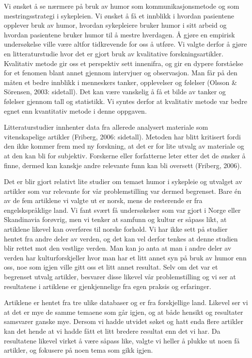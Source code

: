 Vi ønsket å se nærmere på bruk av humor som kommunikasjonsmetode og som
mestringsstrategi i sykepleien. Vi ønsket å få et innblikk i hvordan pasientene
opplever bruk av humor, hvordan sykepleiere bruker humor i sitt arbeid og
hvordan pasientene bruker humor til å mestre hverdagen. Å gjøre en empirisk
undersøkelse ville være altfor tidkrevende for oss å utføre. Vi valgte derfor å
gjøre en litteraturstudie hvor det er gjort bruk av kvalitative
forskningsartikler. Kvalitativ metode gir oss et perspektiv sett innenifra, og
gir en dypere forståelse for et fenomen blant annet gjennom intervjuer og
observasjon. Man får på den måten et bedre innblikk i menneskers tanker,
opplevelser og følelser (Olsson \&{} Sörensen, 2003: sidetall). Det kan være
vanskelig å få et bilde av tanker og følelser gjennom tall og statistikk. Vi
syntes derfor at kvalitativ metode var bedre egnet enn kvantitativ metode i
denne oppgaven.

Litteraturstudier innhenter data fra allerede analysert materiale som
vitenskapelige artikler (Friberg, 2006: sidetall). Metoden har blitt kritisert
fordi den ikke kommer frem med ny forskning, at det er for lite utvalg av
materiale og at den kan bli for subjektiv. Forskerne eller forfatterne leter
etter det de ønsker å finne, dermed kan kanskje andre relevante funn kan bli
oversett (Friberg, 2006).

Det er blir gjort relativt lite studier om temaet humor i sykepleie og utvalget
av artikler som var relevante for vår problemstilling var dermed begrenset.
Bare én av de fem artiklene vi valgte ut er norsk, mens de resterende er fra
engelskspråklige land. Vi fant svært få undersøkelser som var gjort i Norge
eller Skandinavia forøvrig, men vi tenker at samfunn og kultur er såpass likt,
at artiklene likevel kan overføres til norske forhold. Vi har ikke sett på
studier hentet fra andre deler av verden, og det kan vel derfor tenkes at denne
studien blir rettet mot den vestlige verden. Man kan jo anta at man i andre
deler av verden har kulturforskjeller hvor man har et litt annet syn på bruk av
humor enn oss, noe som igjen ville gitt oss et litt annet resultat. Selv om det
var et begrenset utvalg artikler, besvarer disse likevel vår problemstilling og
vi ser at resultatene i artiklene er gjenkjennelige fra egen praksis og
erfaringer.

Artiklene er hentet fra tre ulike databaser og er fra forskjellige land.
Likevel ser vi at det er mye de samme temaene som går igjen, og at både hensikt
og resultater samsvarer ganske mye. Dersom vi hadde utvidet søket og hatt enda
flere artikler kan det hende at vi hadde fått et litt bredere resultat enn det
vi har. Da resultatene likevel virket å være såpass like, valgte vi heller å
plukke ut noen få artikler, og fokusere på noen tema som gikk igjen.

